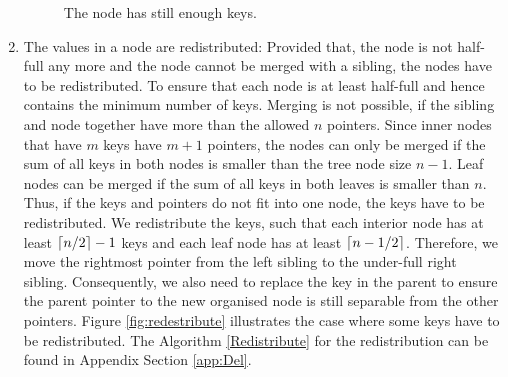 \documentclass[abstracton,12pt,oneside]{scrreprt}
\DeclarePairedDelimiter\ceil{\lceil}{\rceil}
\begin{document}
\begin{enumerate}
\begin{figure}[H]
		\vspace{2mm}
		\caption{The node has still enough keys.}
		\label{fig:enoughkeys}
	\end{figure} 
		

	\item The values in a node are redistributed: Provided that, the node is not half-full any more and the node cannot be merged with a sibling, the nodes have to be redistributed. To ensure that each node is at least half-full and hence contains the minimum number of keys. Merging is not possible, if the sibling and node together have more than the allowed $n$ pointers. Since inner nodes that have $m$ keys have $m+1$ pointers, the nodes can only be merged if the sum of all keys in both nodes is smaller than the tree node size $n-1$. Leaf nodes can be merged if the sum of all keys in both leaves is smaller than $n$. Thus, if the keys and pointers do not fit into one node, the keys have to be redistributed. We redistribute the keys, such that each interior node has at least $\ceil{n/2}-1$ keys and each leaf node has at least $\ceil{n-1/2}$. Therefore, we move the rightmost pointer from the left sibling to the under-full right sibling. Consequently, we also need to replace the key in the parent to ensure the parent pointer to the new organised node is still separable from the other pointers. Figure \ref{fig:redestribute} illustrates the case where some keys have to be redistributed. The Algorithm \ref{Redistribute} for the redistribution can be found in Appendix Section \ref{app:Del}.
		\begin{figure}[ht!]
			\centering
\end{figure}
\end{enumerate}
\end{document}

